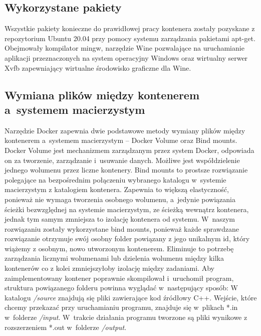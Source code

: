 \subsection{Wykorzystane pakiety}
Wszystkie pakiety konieczne do prawidłowej pracy kontenera zostały pozyskane z repozytorium Ubuntu 20.04 przy pomocy systemu zarządzania pakietami apt-get. Obejmowały kompilator mingw, narzędzie Wine pozwalające na uruchamianie aplikacji przeznaczonych na system operacyjny Windows oraz wirtualny serwer Xvfb zapewniający wirtualne środowisko graficzne dla Wine.

\subsection{Wymiana plików między kontenerem a~systemem macierzystym}
Narzędzie Docker zapewnia dwie podstawowe metody wymiany plików między kontenerem a~systemem macierzystym -- Docker Volume\cite{dockerVolume} oraz Bind mounts\cite{dockerBindMounts}. Docker Volume jest mechanizmem zarządzanym przez system Docker, odpowiada on za tworzenie, zarządzanie i~usuwanie danych. Możliwe jest współdzielenie jednego wolumenu przez liczne kontenery. Bind mounts to prostsze rozwiązanie polegające na bezpośrednim połączeniu wybranego katalogu w~systemie macierzystym z katalogiem kontenera. Zapewnia to większą elastyczność, ponieważ nie wymaga tworzenia osobnego wolumenu, a~jedynie powiązania ścieżki bezwzględnej na systemie macierzystym, ze ścieżką wewnątrz kontenera, jednak tym samym zmniejsza to izolację kontenera od systemu. W~naszym rozwiązaniu zostały wykorzystane bind mounts, ponieważ każde sprawdzane rozwiązanie otrzymuje swój osobny folder powiązany z jego unikalnym id, który wiążemy z osobnym, nowo utworzonym kontenerem. Eliminuje to potrzebę zarządzania licznymi wolumenami lub dzielenia wolumenu między kilka kontenerów co z kolei zmniejszyłoby izolację między zadaniami. Aby zaimplementowany kontener poprawnie skompilował i~uruchomił program, struktura powiązanego folderu powinna wyglądać w~następujący sposób:
W katalogu \textit{/source} znajdują się pliki zawierające kod źródłowy C++. Wejście, które chcemy przekazać przy uruchamianiu programu, znajduje się w~plikach *.in w~folderze \textit{/input}. W~trakcie działania programu tworzone są pliki wynikowe z rozszerzeniem *.out w~folderze \textit{/output}. 

